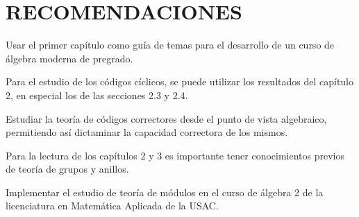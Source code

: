 \chapter{RECOMENDACIONES}



\begin{finalList}

\item Usar el primer capítulo como guía de temas para el desarrollo de un curso de álgebra moderna de pregrado. 

\item Para el estudio de los códigos cíclicos, se puede utilizar los resultados del capítulo 2, en especial los de las secciones 2.3 y 2.4.

\item Estudiar la teoría de códigos correctores desde el punto de vista algebraico, permitiendo así dictaminar la capacidad correctora de los mismos.

\item Para la lectura de los capítulos 2 y 3 es importante tener conocimientos previos de teoría de grupos y anillos. 

\item Implementar el estudio de teoría de módulos en el curso de álgebra 2 de la licenciatura en Matemática Aplicada de la USAC.
\end{finalList}
